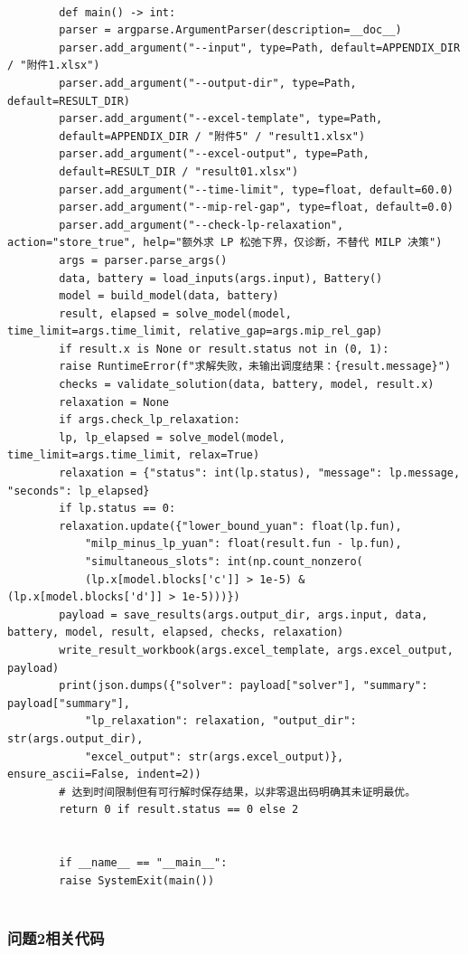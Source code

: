 \documentclass[UTF8]{ctexart}
\begin{document}
\begin{verbatim}
        
        def main() -> int:
        parser = argparse.ArgumentParser(description=__doc__)
        parser.add_argument("--input", type=Path, default=APPENDIX_DIR / "附件1.xlsx")
        parser.add_argument("--output-dir", type=Path, default=RESULT_DIR)
        parser.add_argument("--excel-template", type=Path,
        default=APPENDIX_DIR / "附件5" / "result1.xlsx")
        parser.add_argument("--excel-output", type=Path,
        default=RESULT_DIR / "result01.xlsx")
        parser.add_argument("--time-limit", type=float, default=60.0)
        parser.add_argument("--mip-rel-gap", type=float, default=0.0)
        parser.add_argument("--check-lp-relaxation", action="store_true", help="额外求 LP 松弛下界，仅诊断，不替代 MILP 决策")
        args = parser.parse_args()
        data, battery = load_inputs(args.input), Battery()
        model = build_model(data, battery)
        result, elapsed = solve_model(model, time_limit=args.time_limit, relative_gap=args.mip_rel_gap)
        if result.x is None or result.status not in (0, 1):
        raise RuntimeError(f"求解失败，未输出调度结果：{result.message}")
        checks = validate_solution(data, battery, model, result.x)
        relaxation = None
        if args.check_lp_relaxation:
        lp, lp_elapsed = solve_model(model, time_limit=args.time_limit, relax=True)
        relaxation = {"status": int(lp.status), "message": lp.message, "seconds": lp_elapsed}
        if lp.status == 0:
        relaxation.update({"lower_bound_yuan": float(lp.fun),
            "milp_minus_lp_yuan": float(result.fun - lp.fun),
            "simultaneous_slots": int(np.count_nonzero(
            (lp.x[model.blocks['c']] > 1e-5) & (lp.x[model.blocks['d']] > 1e-5)))})
        payload = save_results(args.output_dir, args.input, data, battery, model, result, elapsed, checks, relaxation)
        write_result_workbook(args.excel_template, args.excel_output, payload)
        print(json.dumps({"solver": payload["solver"], "summary": payload["summary"],
            "lp_relaxation": relaxation, "output_dir": str(args.output_dir),
            "excel_output": str(args.excel_output)}, ensure_ascii=False, indent=2))
        # 达到时间限制但有可行解时保存结果，以非零退出码明确其未证明最优。
        return 0 if result.status == 0 else 2
        
        
        if __name__ == "__main__":
        raise SystemExit(main())
        
    \end{verbatim}
    
    \subsubsection*{问题2相关代码}
    
\end{document}
